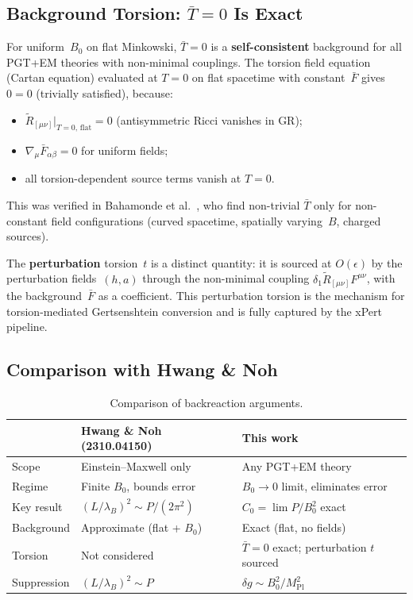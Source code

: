 \subsection{Background Torsion: $\bar{T} = 0$ Is Exact}
\label{sec:bv-background-torsion}

For uniform~$B_0$ on flat Minkowski, $\bar{T} = 0$ is a
\textbf{self-consistent} background for all PGT+EM theories with
non-minimal couplings.  The torsion field equation (Cartan equation)
evaluated at $T = 0$ on flat spacetime with constant~$\bar{F}$ gives
$0 = 0$ (trivially satisfied), because:
\begin{itemize}
  \item $\widetilde{R}_{[\mu\nu]}\big|_{T=0,\,\text{flat}} = 0$
    (antisymmetric Ricci vanishes in GR);
  \item $\nabla_\mu \bar{F}_{\alpha\beta} = 0$ for uniform fields;
  \item all torsion-dependent source terms vanish at $T = 0$.
\end{itemize}
This was verified in Bahamonde et al.~\cite{bahamonde2025torsion},
who find non-trivial $\bar{T}$ only for non-constant field configurations
(curved spacetime, spatially varying~$B$, charged sources).

The \textbf{perturbation} torsion~$t$ is a distinct quantity: it is
sourced at $O(\epsilon)$ by the perturbation fields~$(h, a)$ through the
non-minimal coupling $\delta_1 \widetilde{R}_{[\mu\nu]} F^{\mu\nu}$,
with the background~$\bar{F}$ as a coefficient.  This perturbation
torsion is the mechanism for torsion-mediated Gertsenshtein conversion
and is fully captured by the xPert pipeline.


\subsection{Comparison with Hwang \& Noh}
\label{sec:bv-hwang-noh}

\begin{table}[htbp]
\centering
\caption{Comparison of backreaction arguments.}
\label{tab:bv-comparison}
\begin{tabular}{@{}lll@{}}
\toprule
& Hwang \& Noh (2310.04150) & This work \\
\midrule
Scope & Einstein--Maxwell only & Any PGT+EM theory \\
Regime & Finite $B_0$, bounds error & $B_0 \to 0$ limit, eliminates error \\
Key result & $(L/\lambda_B)^2 \sim P/(2\pi^2)$ & $C_0 = \lim P/B_0^2$ exact \\
Background & Approximate (flat + $B_0$) & Exact (flat, no fields) \\
Torsion & Not considered & $\bar{T} = 0$ exact; perturbation $t$ sourced \\
Suppression & $(L/\lambda_B)^2 \sim P$ & $\delta g \sim B_0^2 / M_\mathrm{Pl}^2$ \\
\bottomrule
\end{tabular}
\end{table}

